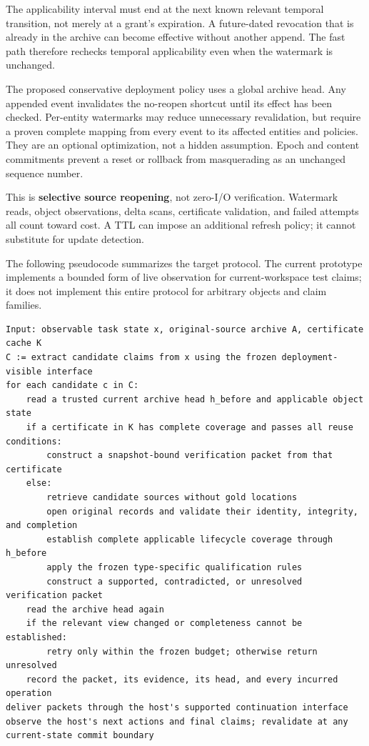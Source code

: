 The applicability interval must end at the next known relevant temporal
transition, not merely at a grant's expiration. A future-dated
revocation that is already in the archive can become effective without
another append. The fast path therefore rechecks temporal applicability
even when the watermark is unchanged.

The proposed conservative deployment policy uses a global archive head.
Any appended event invalidates the no-reopen shortcut until its effect
has been checked. Per-entity watermarks may reduce unnecessary
revalidation, but require a proven complete mapping from every event to
its affected entities and policies. They are an optional optimization,
not a hidden assumption. Epoch and content commitments prevent a reset
or rollback from masquerading as an unchanged sequence number.

This is \textbf{selective source reopening}, not zero-I/O verification.
Watermark reads, object observations, delta scans, certificate
validation, and failed attempts all count toward cost. A TTL can impose
an additional refresh policy; it cannot substitute for update detection.

The following pseudocode summarizes the target protocol. The current
prototype implements a bounded form of live observation for
current-workspace test claims; it does not implement this entire
protocol for arbitrary objects and claim families.

\begin{verbatim}
Input: observable task state x, original-source archive A, certificate cache K
C := extract candidate claims from x using the frozen deployment-visible interface
for each candidate c in C:
    read a trusted current archive head h_before and applicable object state
    if a certificate in K has complete coverage and passes all reuse conditions:
        construct a snapshot-bound verification packet from that certificate
    else:
        retrieve candidate sources without gold locations
        open original records and validate their identity, integrity, and completion
        establish complete applicable lifecycle coverage through h_before
        apply the frozen type-specific qualification rules
        construct a supported, contradicted, or unresolved verification packet
    read the archive head again
    if the relevant view changed or completeness cannot be established:
        retry only within the frozen budget; otherwise return unresolved
    record the packet, its evidence, its head, and every incurred operation
deliver packets through the host's supported continuation interface
observe the host's next actions and final claims; revalidate at any current-state commit boundary
\end{verbatim}

